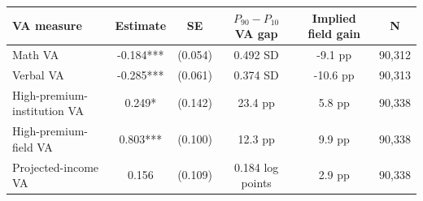 \begin{tabular}{lccccc}
\toprule
VA measure & Estimate & SE & $P_{90}-P_{10}$ VA gap & Implied field gain & N \\
\midrule
Math VA & -0.184*** & (0.054) & 0.492 SD & -9.1 pp & 90,312 \\
Verbal VA & -0.285*** & (0.061) & 0.374 SD & -10.6 pp & 90,313 \\
High-premium-institution VA & 0.249* & (0.142) & 23.4 pp & 5.8 pp & 90,338 \\
High-premium-field VA & 0.803*** & (0.100) & 12.3 pp & 9.9 pp & 90,338 \\
Projected-income VA & 0.156 & (0.109) & 0.184 log points & 2.9 pp & 90,338 \\
\bottomrule
\end{tabular}
